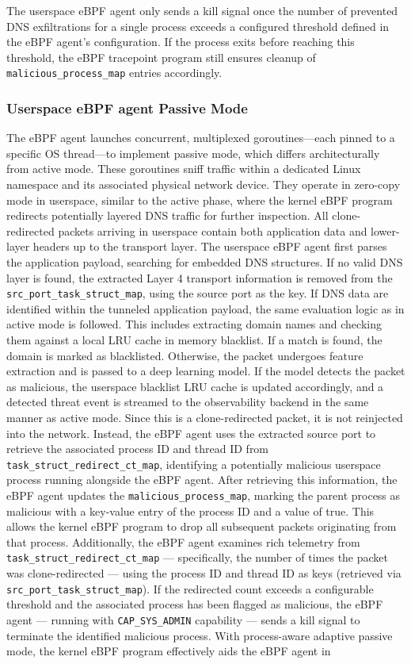 \documentclass [11pt, proquest] {uwthesis}[2020/02/24]
\begin{document}
The userspace eBPF agent only sends a kill signal once the number of prevented DNS exfiltrations for a single process exceeds a configured threshold defined in the eBPF agent’s configuration. If the process exits before reaching this threshold, the eBPF tracepoint program still ensures cleanup of \texttt{malicious\_process\_map} entries accordingly.

\subsubsection{\textbf{Userspace eBPF agent Passive Mode}}
\label{passive:sec2}
The eBPF agent launches concurrent, multiplexed goroutines—each pinned to a specific OS thread—to implement passive mode, which differs architecturally from active mode. These goroutines sniff traffic within a dedicated Linux namespace and its associated physical network device. They operate in zero-copy mode in userspace, similar to the active phase, where the kernel eBPF program redirects potentially layered DNS traffic for further inspection. All clone-redirected packets arriving in userspace contain both application data and lower-layer headers up to the transport layer. The userspace eBPF agent first parses the application payload, searching for embedded DNS structures. If no valid DNS layer is found, the extracted Layer 4 transport information is removed from the \texttt{src\_port\_task\_struct\_map}, using the source port as the key. If DNS data are identified within the tunneled application payload, the same evaluation logic as in active mode is followed. This includes extracting domain names and checking them against a local LRU cache in memory blacklist. If a match is found, the domain is marked as blacklisted. Otherwise, the packet undergoes feature extraction and is passed to a deep learning model. If the model detects the packet as malicious, the userspace blacklist LRU cache is updated accordingly, and a detected threat event is streamed to the observability backend in the same manner as active mode. Since this is a clone-redirected packet, it is not reinjected into the network. Instead, the eBPF agent uses the extracted source port to retrieve the associated process ID and thread ID from \texttt{task\_struct\_redirect\_ct\_map}, identifying a potentially malicious userspace process running alongside the eBPF agent. After retrieving this information, the eBPF agent updates the \texttt{malicious\_process\_map}, marking the parent process as malicious with a key-value entry of the process ID and a value of true. This allows the kernel eBPF program to drop all subsequent packets originating from that process. Additionally, the eBPF agent examines rich telemetry from \texttt{task\_struct\_redirect\_ct\_map} — specifically, the number of times the packet was clone-redirected — using the process ID and thread ID as keys (retrieved via \texttt{src\_port\_task\_struct\_map}). If the redirected count exceeds a configurable threshold and the associated process has been flagged as malicious, the eBPF agent — running with \texttt{CAP\_SYS\_ADMIN} capability — sends a kill signal to terminate the identified malicious process. With process-aware adaptive passive mode, the kernel eBPF program effectively aids the eBPF agent in 
\end{document}
